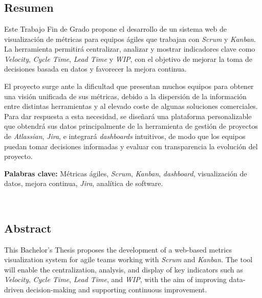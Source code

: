\chapter*{}


\section*{Resumen}

Este Trabajo Fin de Grado propone el desarrollo de un sistema web de visualización de métricas para equipos ágiles que trabajan con \textit{Scrum} y \textit{Kanban}. La herramienta permitirá centralizar, analizar y mostrar indicadores clave como \textit{Velocity}, \textit{Cycle Time}, \textit{Lead Time} y \textit{WIP}, con el objetivo de mejorar la toma de decisiones basada en datos y favorecer la mejora continua.

El proyecto surge ante la dificultad que presentan muchos equipos para obtener una visión unificada de sus métricas, debido a la dispersión de la información entre distintas herramientas y al elevado coste de algunas soluciones comerciales. Para dar respuesta a esta necesidad, se diseñará una plataforma personalizable que obtendrá sus datos principalmente de la herramienta de gestión de proyectos de \textit{Atlassian}, \textit{Jira}, e integrará \textit{dashboards} intuitivos, de modo que los equipos puedan tomar decisiones informadas y evaluar con transparencia la evolución del proyecto.

\noindent\textbf{Palabras clave:} 
Métricas ágiles, \textit{Scrum}, \textit{Kanban}, \textit{dashboard}, visualización de datos, mejora continua, \textit{Jira}, analítica de software.


\clearpage
{}
\\[0.2em]

\section*{Abstract}

This Bachelor's Thesis proposes the development of a web-based metrics visualization system for agile teams working with \textit{Scrum} and \textit{Kanban}. The tool will enable the centralization, analysis, and display of key indicators such as \textit{Velocity}, \textit{Cycle Time}, \textit{Lead Time}, and \textit{WIP}, with the aim of improving data-driven decision-making and supporting continuous improvement.

